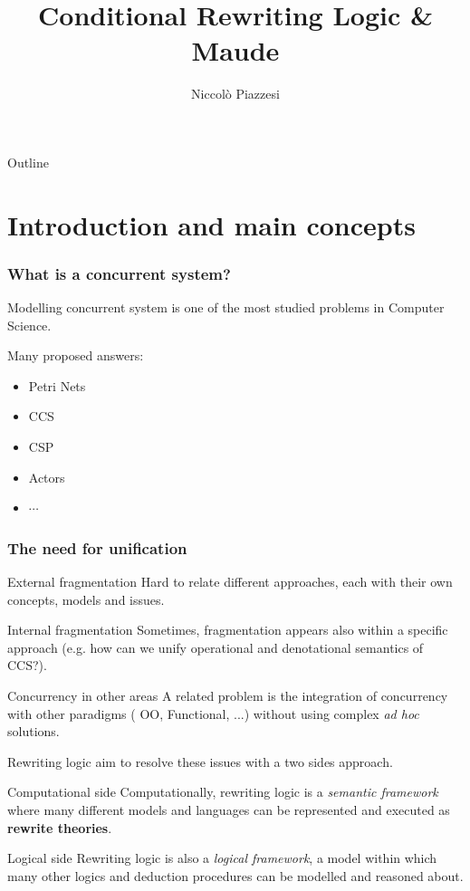 \documentclass{beamer}
\title{Conditional Rewriting Logic \& Maude}
\author{Niccolò Piazzesi}
\institute{
    Università degli studi di Pisa
}
\begin{document}
\frame{\titlepage}

\begin{frame}{Outline}
    \tableofcontents[hideallsubsections]
\end{frame}
\section{Introduction and main concepts}
\begin{frame}
    \frametitle{What is a concurrent system?}
    Modelling concurrent system is one of the most studied problems in Computer Science.

    \bigskip
    \pause
    Many proposed answers:\begin{itemize}
        \item Petri Nets 
        \item CCS
        \item CSP 
        \item Actors
        \item $\cdots$
    \end{itemize}
\end{frame}
\begin{frame}
    \frametitle{The need for unification}
    \pause
        \begin{block}{External fragmentation}
            Hard to relate different approaches, each with their own concepts, models and issues.
        \end{block}
    \pause 
    \begin{block}{Internal fragmentation}
        Sometimes, fragmentation appears also within a specific approach (e.g. how can we unify operational and denotational semantics of CCS?).
    \end{block}
    \pause
    \begin{block}{Concurrency in other areas}
        A related problem is the integration of concurrency with other paradigms ( OO, Functional, ...)
        without using complex \emph{ad hoc} solutions.
    \end{block}
\end{frame}

\begin{frame}
    
    Rewriting logic aim to resolve these issues with a two sides approach.
    \pause
    \begin{block}{Computational side}
        Computationally, rewriting logic is a \emph{semantic framework} where many different 
        models and languages can be represented and executed as \textbf{rewrite theories}. 
    \end{block}
    \pause
    \begin{block}{Logical side}
        Rewriting logic  is also a \emph{logical framework}, a model within which 
        many other logics and deduction procedures  can be modelled and reasoned about.        
    \end{block}
\end{frame}
\end{document}
